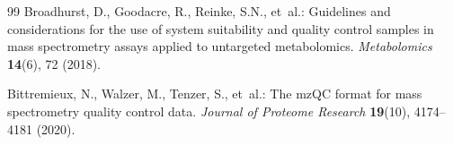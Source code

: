 \documentclass[11pt,twoside,openright]{book}
\begin{document}
\begin{thebibliography}{99}
Broadhurst, D., Goodacre, R., Reinke, S.N., et~al.:
\newblock Guidelines and considerations for the use of system suitability and quality control samples in mass spectrometry assays applied to untargeted metabolomics.
\newblock \emph{Metabolomics} \textbf{14}(6), 72 (2018).
\newblock {}

Bittremieux, N., Walzer, M., Tenzer, S., et~al.:
\newblock The {mzQC} format for mass spectrometry quality control data.
\newblock \emph{Journal of Proteome Research} \textbf{19}(10), 4174--4181 (2020).
\newblock {}

\end{thebibliography}
\end{document}

